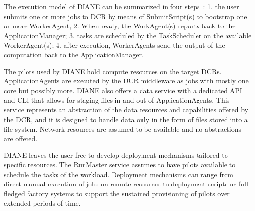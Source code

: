 \documentclass{sig-alternate}
\begin{document}
The execution model of DIANE can be summarized in four
steps~\cite{moscicki2011understanding}: 1. the user submits one or more jobs to
DCR by means of SubmitScript(s) to bootstrap one or more WorkerAgent; 2. When
ready, the WorkAgent(s) reports back to the ApplicationManager; 3. tasks are
scheduled by the TaskScheduler on the available WorkerAgent(s); 4. after
execution, WorkerAgents send the output of the computation back to the
ApplicationManager.

 


The pilots used by DIANE hold compute resources on the target DCRs.
ApplicationAgents are executed by the DCR middleware as jobs with mostly one
core but possibly more. DIANE also offers a data service with a dedicated API
and CLI that allows for staging files in and out of ApplicationAgents. This
service represents an abstraction of the data resources and capabilities offered
by the DCR, and it is designed to handle data only in the form of files stored
into a file system. Network resources are assumed to be available and no
abstractions are offered.


DIANE leaves the user free to develop deployment mechanisms tailored to specific
resources. The RunMaster service assumes to have pilots available to schedule
the tasks of the workload. Deployment mechanisms can range from direct manual
execution of jobs on remote resources to deployment scripts or full-fledged
factory systems to support the sustained provisioning of pilots over extended
periods of time.
\end{document}
